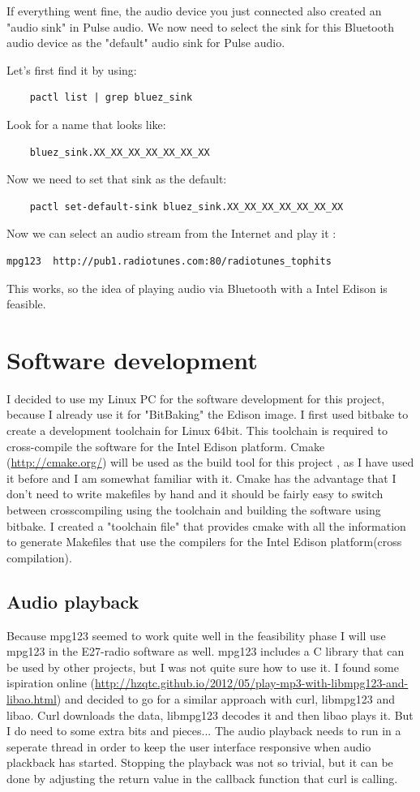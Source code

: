 \documentclass[12pt,a4paper]{scrreprt}
\begin{document}
If everything went fine, the audio device you just connected also created an "audio sink" in Pulse audio. We now need to select the sink for this Bluetooth audio device as the "default" audio sink for Pulse audio.

Let's first find it by using:
	\begin{verbatim}
	pactl list | grep bluez_sink
	\end{verbatim}
Look for a name that looks like:
	\begin{verbatim}
	bluez_sink.XX_XX_XX_XX_XX_XX_XX
	\end{verbatim}


Now we need to set that sink as the default:
	\begin{verbatim}
	pactl set-default-sink bluez_sink.XX_XX_XX_XX_XX_XX_XX 
	\end{verbatim}

Now we can select an audio stream from the Internet and play it :
	\begin{verbatim}
mpg123  http://pub1.radiotunes.com:80/radiotunes_tophits
	\end{verbatim}

This works, so the idea of playing audio via Bluetooth with a Intel Edison is feasible.

\section{Software development}
I decided to use my Linux PC for the software development for this project, because I already use it for "BitBaking" the Edison image.
I first used bitbake to create a development toolchain for Linux 64bit. This toolchain is required to cross-compile the software for the Intel Edison platform.
Cmake (\url{http://cmake.org/}) will be used as the build tool for this project , as I have used it before and I am somewhat familiar with it.
Cmake has the advantage that I don't need to write makefiles by hand and it should be fairly easy to switch between crosscompiling using the toolchain and building the software using bitbake.
I created a "toolchain file" that provides cmake with all the information to generate Makefiles that use the compilers for the Intel Edison platform(cross compilation). 

\subsection{Audio playback}
Because mpg123 seemed to work quite well in the feasibility phase I will use mpg123 in the E27-radio software as well. mpg123 includes a C library that can be used by other projects, but I was not quite sure how to use it.
I found some ispiration online (\url{http://hzqtc.github.io/2012/05/play-mp3-with-libmpg123-and-libao.html}) and decided to go for a similar approach with curl, libmpg123 and libao. 
Curl downloads the data, libmpg123 decodes it and then libao plays it.
But I do need to some extra bits and pieces... 
The audio playback needs to run in a seperate thread in order to keep the user interface responsive when audio plackback has started. Stopping the playback was not so trivial, but it can be done by adjusting the return value in the  callback function that curl is calling.  
\end{document}
